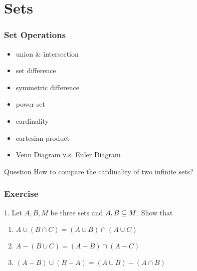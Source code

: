 \documentclass[xcolor=table]{beamer}
\begin{document}
\section{Sets}
\begin{frame}
    \frametitle{Set Operations}
    \begin{itemize}
        \item union \& intersection
        \item set difference
        \item symmetric difference
        \item power set
        \item cardinality
        \item cartesian product
        \item Venn Diagram v.s. Euler Diagram 
    \end{itemize}
    \vv
    \begin{block}{Question}
        How to compare the cardinality of two infinite sets?
    \end{block}
\end{frame}
\begin{frame}
    \frametitle{Exercise}
    1. Let $A, B, M$ be three sets and $A, B \subseteq M$. Show that
    \begin{enumerate}
        \item $A \cup(B \cap C)=(A \cup B) \cap(A \cup C)$
        \item $A-(B \cup C)=(A-B) \cap(A-C)$
        \item $(A - B) \cup (B - A) = (A \cup B) - (A \cap B)$
    \end{enumerate}
    \vv
\end{frame}
\end{document}
